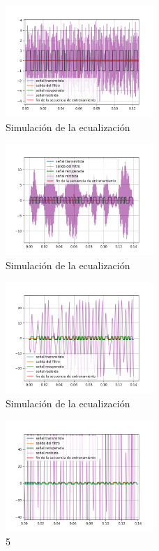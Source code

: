\documentclass[main.tex]{subfiles}
\begin{document}
\begin{figure}[hp]
	\centering
	\includegraphics[width=0.5\textwidth]{imagenes/out2.png}
	\caption{Simulaci\'on de la ecualizaci\'on}
\end{figure}


\begin{figure}[hp]
	\centering
	\includegraphics[width=0.5\textwidth]{imagenes/out3.png}
	\caption{Simulaci\'on de la ecualizaci\'on}
\end{figure}


\begin{figure}[hp]
	\centering
	\includegraphics[width=0.5\textwidth]{imagenes/out4.png}
	\caption{Simulaci\'on de la ecualizaci\'on}
\end{figure}


\begin{figure}[hp]
	\centering
	\includegraphics[width=0.5\textwidth]{imagenes/out5.png}
	\caption{5}
\end{figure}
\end{document}
